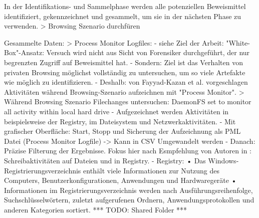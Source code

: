\cite{Izzati.2022}
In der Identifikations- und Sammelphase werden alle potenziellen Beweismittel identifiziert, gekennzeichnet und gesammelt, um sie in der nächsten Phase zu verwenden.
> Browsing Szenario durchfüren

Gesammelte Daten:
> Process Monitor Logfiles:
	- siehe Ziel der Arbeit: "White-Box"-Ansatz: Versuch wird nicht aus Sicht von Forensiker durchgeführt, der nur begrenzten Zugriff auf Beweismittel hat. 
	- Sondern: Ziel ist das Verhalten von privaten Browsing möglichst vollständig zu untersuchen, um so viele Artefakte wie möglich zu identifizieren.
	- Deshalb: von Fayyad-Kazan et al. vorgeschlagen \cite{Fayyad.2021} Aktivitäten während Browsing-Szenario aufzeichnen mit "Process Monitor".
		> Während Browsing Szenario Filechanges untersuchen: DaemonFS set to monitor all activity within local hard drive\cite{Ohana.2013}
	- Aufgezeichnet werden Aktivitäten in beispielsweise der Registry, im Dateisystem und Netzwerkaktivitäten.
	- Mit grafischer Oberfläche: Start, Stopp und Sicherung der Aufzeichnung als PML Datei (Process Monitor Logfile) -> Kann in CSV Umgewandelt werden
	- Danach: Präzise Filterung der Ergebnisse. Fokus hier nach Esmpfehlung von Autoren in \cite{Fayyad.2021}: Schreibaktivitäten auf Dateien und in Registry. 
		- Registry: \cite{Rochmadi.2017}
			•	Das Windows-Registrierungsverzeichnis enthält viele Informationen zur Nutzung des Computers, Benutzerkonfigurationen, Anwendungen und Hardwaregeräte
			•	Informationen im Registrierungsverzeichnis werden nach Ausführungsreihenfolge, Suchschlüsselwörtern, zuletzt aufgerufenen Ordnern, Anwendungsprotokollen und anderen Kategorien sortiert.
	*** TODO: Shared Folder ***

